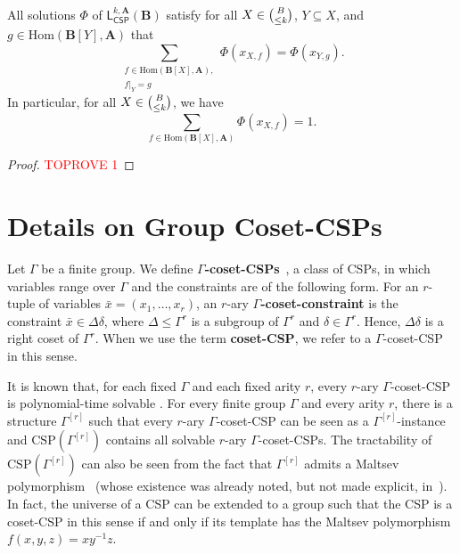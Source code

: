 \documentclass[a4paper,english, thm-restate]{lipics-v2021}
\newcommand{\defining}[1]{\textbf{#1}}
\newcommand{\tup}[1]{\bar{#1}}
\newcommand{\StructA}{\mathbf{A}}
\newcommand{\StructB}{\mathbf{B}}
\newcommand{\CSP}[1]{\mathrm{CSP}(#1)}
\newcommand{\restrict}[2]{#1|_{#2}}
\newcommand{\Hom}[2]{\mathrm{Hom}(#1,#2)}
\newcommand{\leqs}{\mathsf{L}}
\newcommand{\cspiso}[3]{\leqs^{#1,#2}_{\mathsf{CSP}}(#3)}
\newcommand{\CosetGrpTmplt}[2]{#1^{[#2]}}
\begin{document}
	\begin{lemma}
		\label{lem:csp-iso-subsets}
		All solutions $\Phi$ of $\cspiso{k}{\StructA}{\StructB}$ satisfy for all $X \in \tbinom{B}{\leq k}$, $Y \subseteq X$, and $g \in \Hom{\StructB[Y]}{\StructA}$
		that 
		\[\sum_{\substack{f\in \Hom{\StructB[X]}{\StructA},\\\restrict{f}{Y} = g}} \Phi(x_{X,f}) = \Phi(x_{Y,g}). \]
		In particular, for all $X \in \tbinom{B}{\leq k}$, we have
		\[\sum_{f\in \Hom{\StructB[X]}{\StructA}} \Phi(x_{X,f}) = 1.\]
	\end{lemma}
	\begin{proof}\textcolor{red}{TOPROVE 1}\end{proof}
	
	
	
	
	
	
	
	
	
	
	
	
	
	
	
	
	
	
	
	
	
	\section{Details on Group Coset-CSPs}
	\label{app:groupCSP}
	
	
	Let $\Gamma$ be a finite group.
	We define \defining{$\Gamma$-coset-CSPs}~\cite{BerkholzGrohe2015, feder1993monotone}, a class of CSPs, in which variables range over $\Gamma$ and the constraints are of the following form. 
	For an $r$-tuple of variables $\tup{x} = (x_1, \dots, x_r)$,
	an $r$-ary \defining{$\Gamma$-coset-constraint} is the constraint
	$\tup{x} \in \Delta\delta$, where $\Delta \leq \Gamma^r$ is a subgroup
	of $\Gamma^r$ and $\delta \in \Gamma^r$.
	Hence, $\Delta\delta$ is a right coset of $\Gamma^r$.
	When we use the term \defining{coset-CSP}, we refer to a $\Gamma$-coset-CSP in this sense.
	
	It is known that, for each fixed $\Gamma$ and each fixed arity $r$, every $r$-ary $\Gamma$-coset-CSP is polynomial-time solvable \cite{feder1993monotone}.
	For every finite group $\Gamma$ and every arity $r$, there is a structure $\CosetGrpTmplt{\Gamma}{r}$ such that every $r$-ary $\Gamma$-coset-CSP
	can be seen as a $\CosetGrpTmplt{\Gamma}{r}$-instance
	and $\CSP{\CosetGrpTmplt{\Gamma}{r}}$ contains all solvable $r$-ary $\Gamma$\nobreakdash-coset-CSPs.
	The tractability of $\CSP{\CosetGrpTmplt{\Gamma}{r}}$ can also be seen from the fact that $\CosetGrpTmplt{\Gamma}{r}$ admits a Maltsev polymorphism~\cite{BulatovDalmau2006}
	(whose existence was already noted, but not made explicit, in~\cite{BerkholzGrohe2015}).
	In fact, the universe of a CSP can be extended to a group such that
	the CSP is a coset-CSP in this sense if and only if its template has the Maltsev polymorphism $f(x,y,z) = xy^{-1}z$.
	
\end{document}
